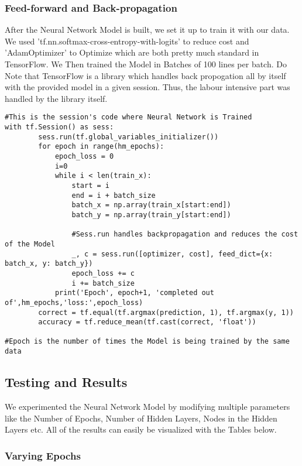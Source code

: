 \subsubsection{Feed-forward and Back-propagation}
After the Neural Network Model is built, we set it up to train it with our data. We used 'tf.nn.softmax-cross-entropy-with-logits' to reduce cost and 'AdamOptimizer' to Optimize  which are both pretty much standard in TensorFlow. We Then trained the Model in Batches of 100 lines per batch. Do Note that TensorFlow is a library which handles back propogation all by itself with the provided model in a given session. Thus, the labour intensive part was handled by the library itself.

\begin{verbatim}
#This is the session's code where Neural Network is Trained
with tf.Session() as sess:
        sess.run(tf.global_variables_initializer())
        for epoch in range(hm_epochs):
            epoch_loss = 0
            i=0
            while i < len(train_x):
                start = i
                end = i + batch_size
                batch_x = np.array(train_x[start:end])
                batch_y = np.array(train_y[start:end])
                
                #Sess.run handles backpropagation and reduces the cost of the Model
                _, c = sess.run([optimizer, cost], feed_dict={x: batch_x, y: batch_y})
                epoch_loss += c
                i += batch_size
            print('Epoch', epoch+1, 'completed out of',hm_epochs,'loss:',epoch_loss)
        correct = tf.equal(tf.argmax(prediction, 1), tf.argmax(y, 1))
        accuracy = tf.reduce_mean(tf.cast(correct, 'float'))

#Epoch is the number of times the Model is being trained by the same data
\end{verbatim}

\subsection{Testing and Results}
We experimented the Neural Network Model by modifying multiple parameters like the Number of Epochs, Number of Hidden Layers, Nodes in the Hidden Layers etc. All of the results can easily be visualized with the Tables below.

\subsubsection{Varying Epochs}

